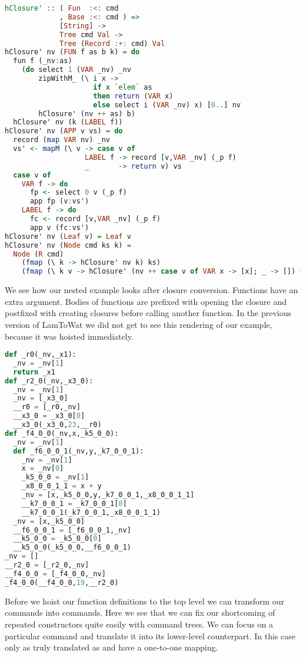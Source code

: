 \begin{lstlisting}[language=Haskell]
hClosure' :: ( Fun  :<: cmd
             , Base :<: cmd ) =>
             [String] ->
             Tree cmd Val ->
             Tree (Record :+: cmd) Val
hClosure' nv (FUN f as b k) = do
  fun f (_nv:as)
    (do select 1 (VAR _nv) _nv
        zipWithM_ (\ i x ->
                     if x `elem` as
                     then return (VAR x)
                     else select i (VAR _nv) x) [0..] nv
        hClosure' (nv ++ as) b)
  hClosure' nv (k (LABEL f))
hClosure' nv (APP v vs) = do
  record (map VAR nv) _nv
  vs' <- mapM (\ v -> case v of
                   LABEL f -> record [v,VAR _nv] (_p f)
                   _       -> return v) vs
  case v of
    VAR f -> do
      fp <- select 0 v (_p f)
      app fp (v:vs')
    LABEL f -> do
      fc <- record [v,VAR _nv] (_p f)
      app v (fc:vs')
hClosure' nv (Leaf v) = Leaf v
hClosure' nv (Node cmd ks k) =
  Node (R cmd)
    (fmap (\ k -> hClosure' nv k) ks)
    (fmap (\ k v -> hClosure' (nv ++ case v of VAR x -> [x]; _ -> []) (k v)) k)
\end{lstlisting}

We see how our nested example  looks after closure conversion. Functions have an extra  argument. Bodies of functions are prefixed with opening the closure and postfixed with creating closures before calling another function. In the previous version of LamToWat we did not get to see this rendering of our example, because it was hoisted immediately.

\begin{lstlisting}[language=Python]
def _r0(_nv,_x1):
  _nv = _nv[1]
  return _x1
def _r2_0(_nv,_x3_0):
  _nv = _nv[1]
  _nv = [_x3_0]
  __r0 = [_r0,_nv]
  __x3_0 = _x3_0[0]
  __x3_0(_x3_0,23,__r0)
def _f4_0_0(_nv,x,_k5_0_0):
  _nv = _nv[1]
  def _f6_0_0_1(_nv,y,_k7_0_0_1):
    _nv = _nv[1]
    x = _nv[0]
    _k5_0_0 = _nv[1]
    _x8_0_0_1_1 = x + y
    _nv = [x,_k5_0_0,y,_k7_0_0_1,_x8_0_0_1_1]
    __k7_0_0_1 = _k7_0_0_1[0]
    __k7_0_0_1(_k7_0_0_1,_x8_0_0_1_1)
  _nv = [x,_k5_0_0]
  __f6_0_0_1 = [_f6_0_0_1,_nv]
  __k5_0_0 = _k5_0_0[0]
  __k5_0_0(_k5_0_0,__f6_0_0_1)
_nv = []
__r2_0 = [_r2_0,_nv]
__f4_0_0 = [_f4_0_0,_nv]
_f4_0_0(__f4_0_0,19,__r2_0)
\end{lstlisting}

Before we hoist our function definitions to the top level we can transform our  commands into  commands. Here we see that we can fix our shortcoming of repeated constructors quite easily with command trees. We can focus on a particular command and translate it into its lower-level counterpart. In this case only  as truly translated as  and  have a one-to-one mapping.

